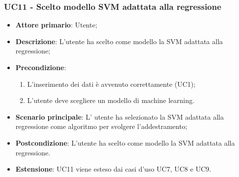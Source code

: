 \subsubsection{UC11 - Scelto modello SVM adattata alla regressione}
\label{sssec:uc11}
\begin{itemize}
  \item \textbf{Attore primario}: Utente;
  \item \textbf{Descrizione}: L'utente ha scelto come modello la SVM adattata alla regressione;
  \item \textbf{Precondizione}:
  \begin{enumerate}
    \item L'inserimento dei dati è avvenuto correttamente (UC1);
    \item L'utente deve scegliere un modello di machine learning.
  \end{enumerate}
  \item \textbf{Scenario principale}: L' utente ha selezionato la SVM adattata alla regressione come algoritmo per svolgere l'addestramento;
  \item \textbf{Postcondizione}: L'utente ha scelto come modello la SVM adattata alla regressione.
  \item \textbf{Estensione}: UC11 viene esteso dai casi d'uso UC7, UC8 e UC9.
\end{itemize}
